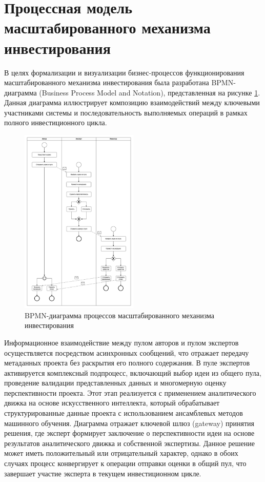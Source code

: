 \documentclass[
    candidate, %
    subf, %
    dotsinheaders=false,
]{disser}
\begin{document}
\section{Процессная модель масштабированного механизма инвестирования}

В целях формализации и визуализации бизнес-процессов функционирования масштабированного механизма инвестирования была разработана BPMN-диаграмма (Business Process Model and Notation), представленная на рисунке \ref{fig:bpmn-diagram}. Данная диаграмма иллюстрирует композицию взаимодействий между ключевыми участниками системы и последовательность выполняемых операций в рамках полного инвестиционного цикла.

\begin{figure}[h]
  \centering
  \includegraphics[width=0.5\textwidth]{./assets/bpmn-diagram.png}
  \caption{BPMN-диаграмма процессов масштабированного механизма инвестирования}
  \label{fig:bpmn-diagram}
\end{figure}


Информационное взаимодействие между пулом авторов и пулом экспертов осуществляется посредством асинхронных сообщений, что отражает передачу метаданных проекта без раскрытия его полного содержания. В пуле экспертов активируется комплексный подпроцесс, включающий выбор идеи из общего пула, проведение валидации представленных данных и многомерную оценку перспективности проекта. Этот этап реализуется с применением аналитического движка на основе искусственного интеллекта, который обрабатывает структурированные данные проекта с использованием ансамблевых методов машинного обучения. Диаграмма отражает ключевой шлюз (gateway) принятия решения, где эксперт формирует заключение о перспективности идеи на основе результатов аналитического движка и собственной экспертизы. Данное решение может иметь положительный или отрицательный характер, однако в обоих случаях процесс конвергирует к операции отправки оценки в общий пул, что завершает участие эксперта в текущем инвестиционном цикле.
\end{document}
